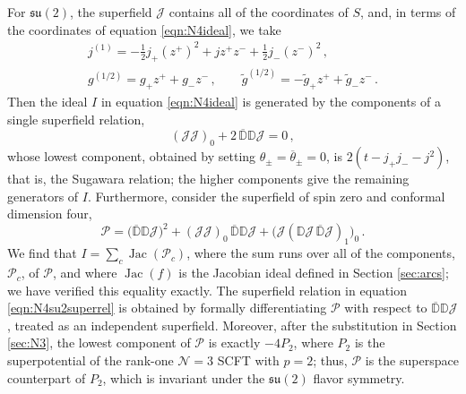 \documentclass[12pt]{article}
\numberwithin{equation}{section}
\numberwithin{figure}{section}
\theoremstyle{plain}
\theoremstyle{definition}
\begin{document}
For $\mathfrak{su}(2)$, the superfield $\mathcal{J}$ contains all of the coordinates of $S$, and, in terms of the coordinates of equation \eqref{eqn:N4ideal}, we take
\begin{equation}
  \begin{gathered}
    j^{(1)} = -\frac{1}{2} j_+ (z^+)^2 + j z^+ z^- + \frac{1}{2} j_- (z^-)^2 \,, \\
    g^{(1/2)} = g_+ z^+ + g_- z^- \,, \qquad \widetilde{g}^{(1/2)} = -\widetilde{g}_+ z^+ + \widetilde{g}_- z^- \,.
  \end{gathered}
\end{equation}
Then the ideal $I$ in equation \eqref{eqn:N4ideal} is generated by the components of a single superfield relation,
\begin{equation}\label{eqn:N4su2superrel}
    (\mathcal{J}\mathcal{J})_0 + 2 \, \overline{\mathbb{D}}\mathbb{D}\mathcal{J} = 0 \,,
\end{equation}
whose lowest component, obtained by setting $\theta_\pm = \overline{\theta}_\pm = 0$, is $2(t - j_+ j_- - j^2)$, that is, the Sugawara relation; the higher components give the remaining generators of $I$. Furthermore, consider the superfield of spin zero and conformal dimension four,
\begin{equation}\label{eqn:N4su2superpot}
    \mathcal{P} = \big( \overline{\mathbb{D}}\mathbb{D}\mathcal{J} \big)^2 + (\mathcal{J}\mathcal{J})_0 \, \overline{\mathbb{D}}\mathbb{D}\mathcal{J} + \big( \mathcal{J} (\mathbb{D}\mathcal{J} \, \overline{\mathbb{D}}\mathcal{J})_1 \big)_0 \,.
\end{equation}
We find that $I = \sum_c \operatorname{Jac}(\mathcal{P}_c)$, where the sum runs over all of the components, $\mathcal{P}_c$, of $\mathcal{P}$, and where $\operatorname{Jac}(f)$ is the Jacobian ideal defined in Section \ref{sec:arcs}; we have verified this equality exactly. The superfield relation in equation \eqref{eqn:N4su2superrel} is obtained by formally differentiating $\mathcal{P}$ with respect to $\overline{\mathbb{D}}\mathbb{D}\mathcal{J}$, treated as an independent superfield. Moreover, after the substitution in Section \ref{sec:N3}, the lowest component of $\mathcal{P}$ is exactly $-4P_2$, where $P_2$ is the superpotential of the rank-one $\mathcal{N}=3$ SCFT with $p = 2$; thus, $\mathcal{P}$ is the superspace counterpart of $P_2$, which is invariant under the $\mathfrak{su}(2)$ flavor symmetry.
\end{document}
